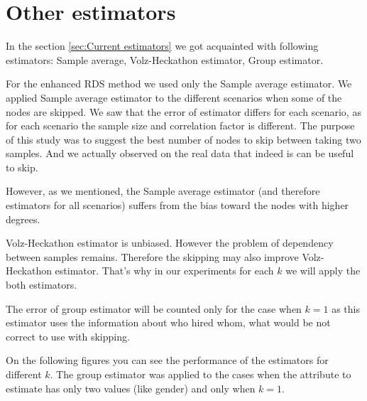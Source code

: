 \documentclass[12pt]{report}
\begin{document}
\section{Other estimators}

In the section \ref{sec:Current estimators} we got acquainted with following estimators: Sample average, Volz-Heckathon estimator, Group estimator. 

For the enhanced RDS method we used only the Sample average estimator. We applied Sample average estimator to the different scenarios when some of the nodes are skipped. We saw that the error of estimator differs for each scenario, as for each scenario the sample size and correlation factor is different. The purpose of this study was to suggest the best number of nodes to skip between taking two samples. And we actually observed on the real data that indeed is can be useful to skip.

However, as we  mentioned, the Sample average estimator (and therefore estimators for all scenarios) suffers from the bias toward the nodes with higher degrees. 

Volz-Heckathon estimator is unbiased. However the problem of dependency between samples remains. 
Therefore the skipping may also improve Volz-Heckathon estimator. That's why in our experiments for each $k$ we will apply the both estimators. 

The error of group estimator will be counted only for the case when $k = 1$ as this estimator uses the information about who hired whom, what would be not correct to use with skipping.


On the following figures you can see the performance of the estimators for different $k$. The group estimator was applied to the cases when the attribute to estimate has only two values (like gender) and only when $k=1$.
\end{document}
